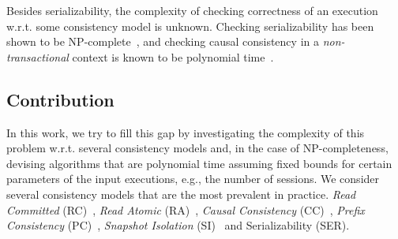 Besides serializability, the complexity of checking correctness of an execution w.r.t. some consistency model is unknown. Checking serializability has been shown to be NP-complete~\cite{DBLP:journals/jacm/Papadimitriou79b}, and checking causal consistency in a \emph{non-transactional} context is known to be polynomial time~\cite{DBLP:conf/popl/BouajjaniEGH17}.

\subsection{Contribution}

In this work, we try to fill this gap by investigating the complexity of this problem w.r.t. several consistency models and, in the case of NP-completeness, devising algorithms that are polynomial time assuming fixed bounds for certain parameters of the input executions, e.g., the number of sessions. We consider several consistency models that are the most prevalent in practice. \emph{Read Committed} (RC)~\cite{DBLP:conf/sigmod/BerensonBGMOO95}, \emph{Read Atomic} (RA)~\cite{DBLP:conf/concur/Cerone0G15},  \emph{Causal Consistency} (CC)~\cite{DBLP:journals/cacm/Lamport78}, \emph{Prefix Consistency} (PC)~\cite{DBLP:conf/ecoop/BurckhardtLPF15}, \emph{Snapshot Isolation} (SI)~\cite{DBLP:conf/sigmod/BerensonBGMOO95} and Serializability (SER).

